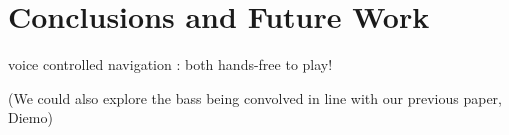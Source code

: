 \section{Conclusions and Future Work}


voice controlled navigation \cite{StowellPlumbley-smc2010-timbre-remapping-regression-tree,Fasciano-si2013b}: both hands-free to play!

(We could also explore the bass being convolved in line with our previous paper, Diemo)